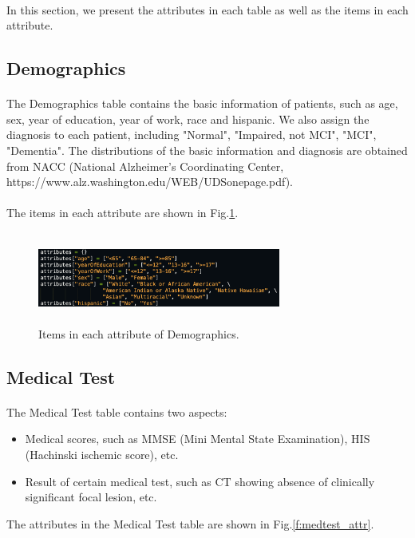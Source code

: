 \documentclass{article}
\begin{document}
\paragraph{}
In this section, we present the attributes in each table as well as the items in each attribute. \\

\subsection{Demographics}
\paragraph{}
The Demographics table contains the basic information of patients, such as age, sex, year of education, year of work, race and hispanic. We also assign the diagnosis to each patient, including "Normal", "Impaired, not MCI", "MCI", "Dementia". The distributions of the basic information and diagnosis are obtained from NACC (National Alzheimer's Coordinating Center, https://www.alz.washington.edu/WEB/UDSonepage.pdf). \\
\\
The items in each attribute are shown in Fig.\ref{f:demographics}.

\begin{figure}[!hbt]
\centering
\includegraphics[width=8cm, height=3cm]{figs/demographics.png}
\caption{Items in each attribute of Demographics.}
\label{f:demographics}
\end{figure}





\subsection{Medical Test}
\paragraph{}
The Medical Test table contains two aspects:

\begin{itemize}
  \item Medical scores, such as MMSE (Mini Mental State Examination), HIS (Hachinski ischemic score), etc.
  \item Result of certain medical test, such as CT showing absence of clinically significant focal lesion, etc.
\end{itemize}
\vspace{2mm}
\noindent The attributes in the Medical Test table are shown in Fig.\ref{f:medtest_attr}.
\end{document}
